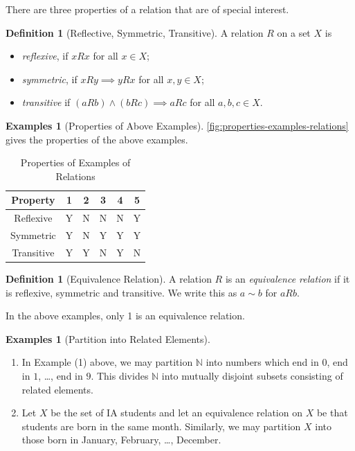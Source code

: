 \documentclass{article}
\theoremstyle{definition}
\newtheorem{definition}[theorem]{Definition}
\newtheorem{examples}[theorem]{Examples}
\theoremstyle{remark}
\newcommand{\pqty}[1]{\left(#1\right)}
\newcommand{\NN}{\mathbb{N}}
\begin{document}
There are three properties of a relation that are of special interest.

\begin{definition}[Reflective, Symmetric, Transitive]
    A relation \(R\) on a set \(X\) is
    \begin{itemize}
        \item \emph{reflexive}, if \(xRx\) for all \(x \in X\);
        \item \emph{symmetric}, if \(xRy \implies yRx\) for all \(x, y \in X\);
        \item \emph{transitive} if \(\pqty{aRb} \land \pqty{bRc} \implies aRc\) for all \(a, b, c \in X\).
    \end{itemize}
\end{definition}

\begin{examples}[Properties of Above Examples]
    \autoref{fig:properties-examples-relations} gives the properties of the above examples.
\end{examples}

\begin{table}[ht!]
    \centering
    \begin{tabular}{c|ccccc}
        Property & 1 & 2 & 3 & 4 & 5 \\
        \hline
        Reflexive  & Y & N & N & N & Y \\
        Symmetric  & Y & N & Y & Y & Y \\
        Transitive & Y & Y & N & Y & N
    \end{tabular}
    \caption{Properties of Examples of Relations}
    \label{fig:properties-examples-relations}
\end{table}

\begin{definition}[Equivalence Relation]
    A relation \(R\) is an \emph{equivalence relation} if it is reflexive, symmetric and transitive. We write this as \(a \sim b\) for \(a R b\).
\end{definition}

In the above examples, only 1 is an equivalence relation.

\begin{examples}[Partition into Related Elements]
    \begin{enumerate}
        \item In Example (1) above, we may partition \(\NN\) into numbers which end in \(0\), end in \(1\), \dots, end in \(9\). This divides \(\NN\) into mutually disjoint subsets consisting of related elements.
        \item Let \(X\) be the set of IA students and let an equivalence relation on \(X\) be that students are born in the same month. Similarly, we may partition \(X\) into those born in January, February, \dots, December.
    \end{enumerate}
\end{examples}
\end{document}
